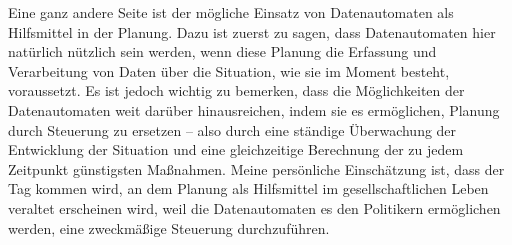 {Eine ganz andere Seite ist der mögliche Einsatz von Datenautomaten als Hilfsmittel in der Planung. Dazu ist zuerst zu sagen, dass Datenautomaten hier natürlich nützlich sein werden, wenn diese Planung die Erfassung und Verarbeitung von Daten über die Situation, wie sie im Moment besteht, voraussetzt. Es ist jedoch wichtig zu bemerken, dass die Möglichkeiten der Datenautomaten weit darüber hinausreichen, indem sie es ermöglichen, Planung durch Steuerung zu ersetzen -- also durch eine ständige Überwachung der Entwicklung der Situation und eine gleichzeitige Berechnung der zu jedem Zeitpunkt günstigsten Maßnahmen. Meine persönliche Einschätzung ist, dass der Tag kommen wird, an dem Planung als Hilfsmittel im gesellschaftlichen Leben veraltet erscheinen wird, weil die Datenautomaten es den Politikern ermöglichen werden, eine zweckmäßige Steuerung durchzuführen.
}
















